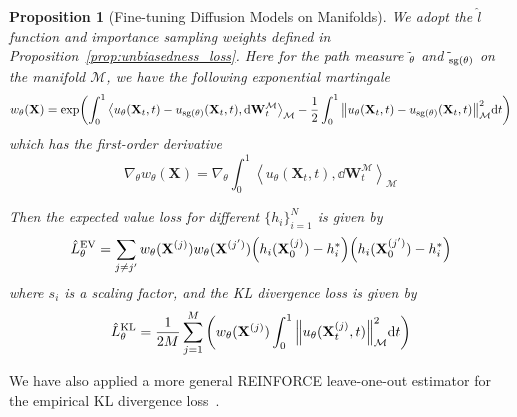 \documentclass{article}
\theoremstyle{plain}
\newtheorem{proposition}[theorem]{Proposition}
\theoremstyle{definition}
\theoremstyle{remark}
\let\P\relax
\DeclareMathOperator{\P}{\mathbb{P}}
\DeclareMathOperator{\sg}{\mathrm{sg}}
\newcommand{\inner}[2]{\left\langle #1, #2\right\rangle}
\begin{document}
\begin{proposition}[Fine-tuning Diffusion Models on Manifolds]\label{prop:diffusion_model_finetune}
    We adopt the $\hat{l}$ function and importance sampling weights defined in Proposition~\ref{prop:unbiasedness_loss}. Here for the path measure $\tilde{\P}_\theta$ and $\tilde{\P}_{\sg(\theta)}$ on the manifold $\mathcal{M}$, we have the following exponential martingale
    \begin{equation}
        w_\theta(\mathbf{X}) = \exp(\int_0^1 \inner{u_\theta(\mathbf{X}_t, t)-u_{\sg(\theta)}(\mathbf{X}_t, t)}{\dd \mathbf{W}_t^\mathcal{M}}_\mathcal{M} -\frac{1}{2}\int_0^1 \norm{u_\theta(\mathbf{X}_t, t)-u_{\sg(\theta)}(\mathbf{X}_t, t)}^2_\mathcal{M} \dd t)
    \end{equation}
    which has the first-order derivative
    \begin{equation}
        \nabla_\theta w_\theta(\mathbf{X}) = \nabla_\theta \int_0^1 \inner{u_\theta(\mathbf{X}_t, t)}{\dd \mathbf{W}_t^\mathcal{M}}_\mathcal{M}
    \end{equation}
    
    Then the expected value loss for different $\{h_i\}_{i=1}^N$ is given by
    \begin{equation}
        \hat{L}_\theta^\text{EV} = \sum_{j\neq j'}w_\theta(\mathbf{X}^{(j)})w_\theta(\mathbf{X}^{(j')})\qty(h_i(\mathbf{X}_0^{(j)})-h_i^*)\qty(h_i(\mathbf{X}_0^{(j')})-h_i^*)
    \end{equation}
    where $s_i$ is a scaling factor, and the KL divergence loss is given by
    \begin{equation}
        \hat{L}_\theta^\text{KL} = \frac{1}{2M} \sum_{j=1}^M \qty(w_\theta(\mathbf{X}^{(j)}) \int_0^1 \norm{u_\theta(\mathbf{X}_t^{(j)}, t)}_\mathcal{M}^2 \dd t)
    \end{equation}
\end{proposition}

We have also applied a more general REINFORCE leave-one-out estimator for the empirical KL divergence loss~\cite{rloo}.
\end{document}
